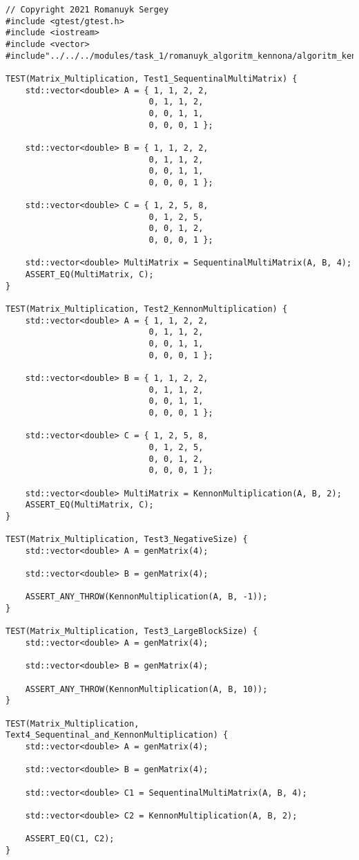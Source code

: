 \documentclass{report}
\begin{document}
\begin{lstlisting}
// Copyright 2021 Romanuyk Sergey
#include <gtest/gtest.h>
#include <iostream>
#include <vector>
#include"../../../modules/task_1/romanuyk_algoritm_kennona/algoritm_kennona.h"

TEST(Matrix_Multiplication, Test1_SequentinalMultiMatrix) {
    std::vector<double> A = { 1, 1, 2, 2,
                             0, 1, 1, 2,
                             0, 0, 1, 1,
                             0, 0, 0, 1 };

    std::vector<double> B = { 1, 1, 2, 2,
                             0, 1, 1, 2,
                             0, 0, 1, 1,
                             0, 0, 0, 1 };

    std::vector<double> C = { 1, 2, 5, 8,
                             0, 1, 2, 5,
                             0, 0, 1, 2,
                             0, 0, 0, 1 };

    std::vector<double> MultiMatrix = SequentinalMultiMatrix(A, B, 4);
    ASSERT_EQ(MultiMatrix, C);
}

TEST(Matrix_Multiplication, Test2_KennonMultiplication) {
    std::vector<double> A = { 1, 1, 2, 2,
                             0, 1, 1, 2,
                             0, 0, 1, 1,
                             0, 0, 0, 1 };

    std::vector<double> B = { 1, 1, 2, 2,
                             0, 1, 1, 2,
                             0, 0, 1, 1,
                             0, 0, 0, 1 };

    std::vector<double> C = { 1, 2, 5, 8,
                             0, 1, 2, 5,
                             0, 0, 1, 2,
                             0, 0, 0, 1 };

    std::vector<double> MultiMatrix = KennonMultiplication(A, B, 2);
    ASSERT_EQ(MultiMatrix, C);
}

TEST(Matrix_Multiplication, Test3_NegativeSize) {
    std::vector<double> A = genMatrix(4);

    std::vector<double> B = genMatrix(4);

    ASSERT_ANY_THROW(KennonMultiplication(A, B, -1));
}

TEST(Matrix_Multiplication, Test3_LargeBlockSize) {
    std::vector<double> A = genMatrix(4);

    std::vector<double> B = genMatrix(4);

    ASSERT_ANY_THROW(KennonMultiplication(A, B, 10));
}

TEST(Matrix_Multiplication, Text4_Sequentinal_and_KennonMultiplication) {
    std::vector<double> A = genMatrix(4);

    std::vector<double> B = genMatrix(4);

    std::vector<double> C1 = SequentinalMultiMatrix(A, B, 4);

    std::vector<double> C2 = KennonMultiplication(A, B, 2);

    ASSERT_EQ(C1, C2);
}
\end{lstlisting}
\end{document}
